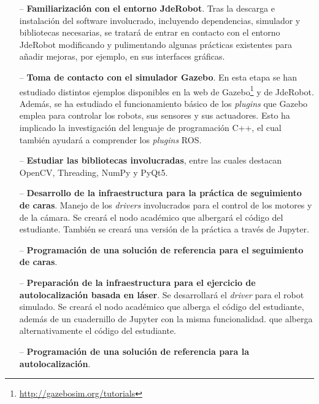 \begin{itemize}
	\item[--] \textbf{Familiarización con el entorno JdeRobot}. Tras la descarga e instalación del software  involucrado, incluyendo dependencias, simulador y bibliotecas necesarias, se tratará de entrar en contacto con el entorno JdeRobot modificando y pulimentando algunas prácticas existentes para añadir mejoras, por ejemplo, en sus interfaces gráficas.
	\item[--] \textbf{Toma de contacto con el simulador Gazebo}. En esta etapa se han estudiado distintos ejemplos disponibles en la web de Gazebo\footnote{\url{http://gazebosim.org/tutorials}} y de JdeRobot. Además, se ha estudiado el funcionamiento básico de los \textit{plugins}  que Gazebo emplea para controlar los robots, sus sensores y sus actuadores. Esto ha implicado la investigación del lenguaje de programación C++, el cual también ayudará a comprender los \textit{plugins} ROS.
	\item[--] \textbf{Estudiar las bibliotecas involucradas}, entre las cuales destacan OpenCV, Threading, NumPy y PyQt5.
	\item[--] \textbf{Desarrollo de la infraestructura para la práctica de seguimiento de caras}. Manejo de los \textit{drivers} involucrados para el control de los motores y de la cámara. Se creará el nodo académico que albergará el código del estudiante. También se creará una versión de la práctica a través de Jupyter.
	\item[--] \textbf{Programación de una solución de referencia para el seguimiento de caras}.
	\item[--] \textbf{Preparación de la infraestructura para el ejercicio de autolocalización basada en láser}. Se desarrollará el \textit{driver} para el robot simulado. Se creará el nodo académico que alberga el código del estudiante, además de un cuadernillo de Jupyter con la misma funcionalidad.
que alberga alternativamente el código del estudiante.
	\item[--] \textbf{Programación de una solución de referencia para la autolocalización}.
\end{itemize}